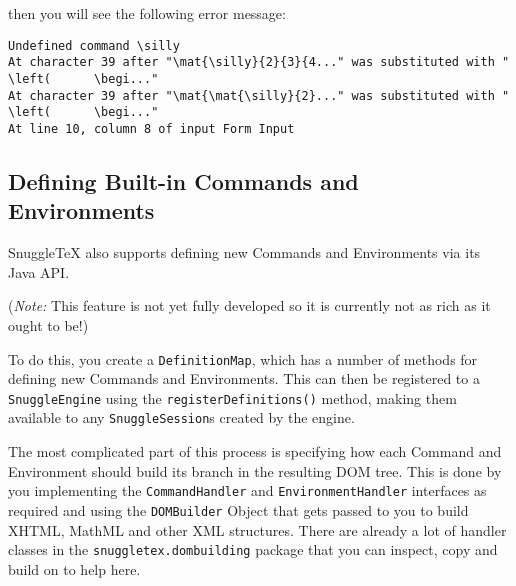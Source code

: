 then you will see the following error message:

\begin{verbatim}
Undefined command \silly
At character 39 after "\mat{\silly}{2}{3}{4..." was substituted with "   \left(      \begi..."
At character 39 after "\mat{\mat{\silly}{2}..." was substituted with "   \left(      \begi..."
At line 10, column 8 of input Form Input
\end{verbatim}

\subsection*{Defining Built-in Commands and Environments}

SnuggleTeX also supports defining new Commands and Environments via its Java API.

(\emph{Note:} This feature is not yet fully developed so it is currently not as
rich as it ought to be!)

To do this, you create a \verb|DefinitionMap|, which has a number of methods for
defining new Commands and Environments. This can then be registered to a \verb|SnuggleEngine|
using the \verb|registerDefinitions()| method, making them available to any \verb|SnuggleSession|s
created by the engine.

The most complicated part of this process is specifying how each Command and
Environment should build its branch in the resulting DOM tree. This is done
by you implementing the \verb|CommandHandler| and \verb|EnvironmentHandler| interfaces
as required and using the \verb|DOMBuilder| Object that gets passed
to you to build XHTML, MathML and other XML structures. There are already a lot
of handler classes in the \verb|snuggletex.dombuilding| package that you can
inspect, copy and build on to help here.
